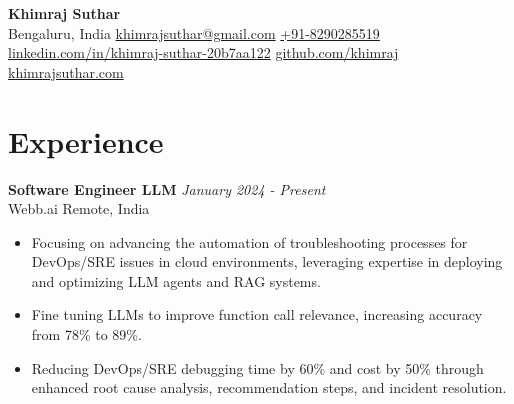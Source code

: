 \documentclass[a4paper,20pt]{article}
\begin{document}
\begin{center}
  \textbf{{\Large Khimraj Suthar}} \\
  Bengaluru, India \hspace{1em} 
  \href{mailto:khimrajsuthar@gmail.com}{khimrajsuthar@gmail.com} \hspace{1em} 
  \href{tel:+918290285519}{+91-8290285519} \\
  \href{https://www.linkedin.com/in/khimraj-suthar-20b7aa122/}{linkedin.com/in/khimraj-suthar-20b7aa122} \hspace{1em} 
  \href{https://github.com/khimraj}{github.com/khimraj} \hspace{1em} 
  \href{https://khimrajsuthar.com}{khimrajsuthar.com}
\end{center}

\section{Experience}
  \noindent\textbf{Software Engineer LLM} \hfill \textit{January 2024 - Present}\\
    Webb.ai \hfill Remote, India
    \vspace{-2pt}
    \begin{itemize}[label=$\circ$]
        \item Focusing on advancing the automation of troubleshooting processes for DevOps/SRE issues in cloud environments, leveraging expertise in deploying and optimizing LLM agents and RAG systems.
        \vspace{-4pt}
        \item Fine tuning LLMs to improve function call relevance, increasing accuracy from 78\% to 89\%.
        \vspace{-4pt}
         \item Reducing DevOps/SRE debugging time by 60\% and cost by 50\% through enhanced root cause analysis, recommendation steps, and incident resolution.
      \end{itemize}
\end{document}
